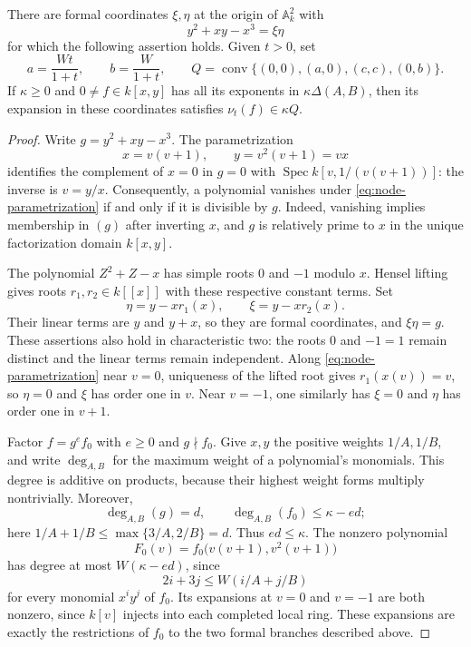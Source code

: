 \begin{lemma}\label{lem:nodal-bound}
There are formal coordinates $\xi,\eta$ at the origin of $\mathbb{A}^2_k$ with
\[
 y^2+xy-x^3=\xi\eta
\]
for which the following assertion holds.  Given $t>0$, set
\[
 a=\frac{Wt}{1+t},\qquad b=\frac{W}{1+t},\qquad
 Q=\operatorname{conv}\{(0,0),(a,0),(c,c),(0,b)\}.
\]
If $\kappa\ge0$ and $0\ne f\in k[x,y]$ has all its exponents in $\kappa\Delta(A,B)$, then its expansion in these coordinates satisfies $\nu_t(f)\in\kappa Q$.
\end{lemma}

\begin{proof}
Write $g=y^2+xy-x^3$.  The parametrization
\begin{equation}\label{eq:node-parametrization}
 x=v(v+1),\qquad y=v^2(v+1)=vx
\end{equation}
identifies the complement of $x=0$ in $g=0$ with $\operatorname{Spec}k[v,1/(v(v+1))]$: the inverse is $v=y/x$. Consequently, a polynomial vanishes under \eqref{eq:node-parametrization} if and only if it is divisible by $g$.  Indeed, vanishing implies membership in $(g)$ after inverting $x$, and $g$ is relatively prime to $x$ in the unique factorization domain $k[x,y]$.

The polynomial $Z^2+Z-x$ has simple roots $0$ and $-1$ modulo $x$. Hensel lifting gives roots $r_1,r_2\in k[[x]]$ with these respective constant terms.  Set
\[
 \eta=y-xr_1(x),\qquad \xi=y-xr_2(x).
\]
Their linear terms are $y$ and $y+x$, so they are formal coordinates, and $\xi\eta=g$.  These assertions also hold in characteristic two: the roots $0$ and $-1=1$ remain distinct and the linear terms remain independent. Along \eqref{eq:node-parametrization} near $v=0$, uniqueness of the lifted root gives $r_1(x(v))=v$, so $\eta=0$ and $\xi$ has order one in $v$. Near $v=-1$, one similarly has $\xi=0$ and $\eta$ has order one in $v+1$.

Factor $f=g^e f_0$ with $e\ge0$ and $g\nmid f_0$.  Give $x,y$ the positive weights $1/A,1/B$, and write $\deg_{A,B}$ for the maximum weight of a polynomial's monomials.  This degree is additive on products, because their highest weight forms multiply nontrivially.  Moreover,
\[
 \deg_{A,B}(g)=d,
 \qquad \deg_{A,B}(f_0)\le\kappa-ed;
\]
here $1/A+1/B\le\max\{3/A,2/B\}=d$.  Thus $ed\le\kappa$. The nonzero polynomial
\[
 F_0(v)=f_0\bigl(v(v+1),v^2(v+1)\bigr)
\]
has degree at most $W(\kappa-ed)$, since
\[
 2i+3j\le W(i/A+j/B)
\]
for every monomial $x^iy^j$ of $f_0$.  Its expansions at $v=0$ and $v=-1$ are both nonzero, since $k[v]$ injects into each completed local ring.  These expansions are exactly the restrictions of $f_0$ to the two formal branches described above.


\end{proof}
